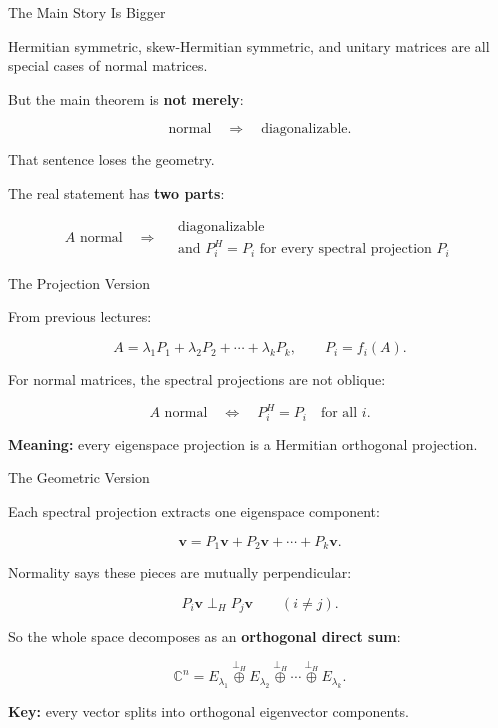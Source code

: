 \documentclass[10pt]{beamer}
\theoremstyle{definition}
\newcommand{\x}[1]{\alert{\textbf{#1}}}
\newcommand{\orthoplus}{\mathbin{\overset{\perp_H}{\oplus}}}
\begin{document}
\begin{frame}{The Main Story Is Bigger}

Hermitian symmetric, skew-Hermitian symmetric, and unitary matrices are all special cases of normal matrices.

\vfill

But the main theorem is \x{not merely}:

$$
\text{normal}\quad\Longrightarrow\quad\text{diagonalizable}.
$$

\vfill

That sentence loses the geometry.

\vfill\pause

The real statement has \x{two parts}:

$$
\boxed{
A\text{ normal}
\quad\Longrightarrow\quad
\begin{array}{c}
\text{diagonalizable}\\[2mm]
\text{and } P_i^H=P_i\text{ for every spectral projection }P_i
\end{array}
}
$$

\end{frame}


\begin{frame}{The Projection Version}

From previous lectures:

$$
A=\lambda_1P_1+\lambda_2P_2+\cdots+\lambda_kP_k,
\qquad
P_i=f_i(A).
$$

\vfill\pause

For normal matrices, the spectral projections are not oblique:

$$
\boxed{
A\text{ normal}
\quad\Longleftrightarrow\quad
P_i^H=P_i\quad\text{for all }i.
}
$$

\vfill\pause

\x{Meaning:} every eigenspace projection is a Hermitian orthogonal projection.

\end{frame}


\begin{frame}{The Geometric Version}

Each spectral projection extracts one eigenspace component:

$$
\mathbf{v}
=P_1\mathbf{v}+P_2\mathbf{v}+\cdots+P_k\mathbf{v}.
$$

\vfill\pause

Normality says these pieces are mutually perpendicular:

$$
P_i\mathbf{v}\perp_H P_j\mathbf{v}
\qquad (i\ne j).
$$

\vfill\pause

So the whole space decomposes as an \x{orthogonal direct sum}:

$$
\boxed{
\mathbb{C}^n
=E_{\lambda_1}\orthoplus E_{\lambda_2}\orthoplus\cdots\orthoplus E_{\lambda_k}.
}
$$

\vfill

\x{Key:} every vector splits into orthogonal eigenvector components.

\end{frame}
\end{document}
